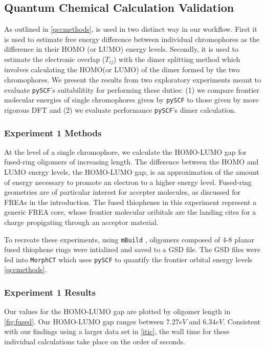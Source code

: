 \label{validation}

\subsection{Quantum Chemical Calculation Validation}

As outlined in \autoref{qccmethods},  is used in two distinct way in our workflow. 
First it is used to estimate free energy
difference between individual chromophores as the difference in their HOMO (or LUMO) energy levels.
Secondly, it is used to estimate the electronic overlap ($T_{ij}$) with the dimer splitting method which involves
calculating the HOMO(or LUMO) of the dimer formed by the two chromophores. We present the results from two
exploratory experiments meant to evaluate \texttt{pySCF}'s suitabilitity for performing these duties:
(1) we compare frontier molecular energies of single chromophores given by \texttt{pySCF} to those
given by more rigorous DFT and (2) we evaluate performance \texttt{pySCF}'s dimer calculation.

\subsubsection{Experiment 1 Methods}

At the level of a single chromophore, we calculate the HOMO-LUMO gap for fused-ring
oligomers of increasing length. 
The difference between the HOMO and LUMO energy levels, the HOMO-LUMO gap, is an approximation of the amount
of energy necessary to promote an electron to a higher energy level.  
Fused-ring geometries are of particular interest for accepter
molecules, as discussed for FREAs in the introduction. 
The fused thiophenes in this experiment represent a generic FREA core, whose frontier molecular oribitals are
the landing cites for a charge propigating through an acceptor material. 

To recreate these experiments, using \texttt{mBuild} \cite{Klein2016}, oligomers composed of 4-8 planar fused thiophene rings
were intialized and saved to a GSD file. The GSD files were fed into \texttt{MorphCT} which uses \texttt{pySCF} to quantify the
frontier orbital energy levels \autoref{qccmethods}.

\subsubsection{Experiment 1 Results}

Our values for the HOMO-LUMO gap are plotted by oligomer length in \autoref{fig:fused}. 
Our HOMO-LUMO gap ranges between $7.27eV$ and $6.34eV$. Consistent with our findings using a larger data set
in \autoref{itic}, the wall time for these individual calculations take place on the order of seconds. 

